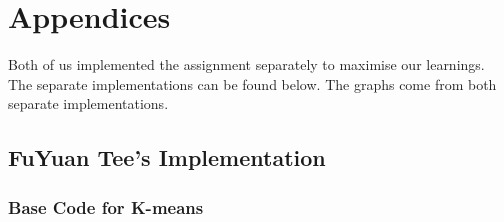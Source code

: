 \documentclass[a4paper,12pt]{article}
\begin{document}
\clearpage
\section{Appendices}
Both of us implemented the assignment separately to maximise our learnings. The separate implementations can be found below. The graphs come from both separate implementations. 

\subsection{FuYuan Tee's Implementation}
\subsubsection{Base Code for K-means}
\end{document}
